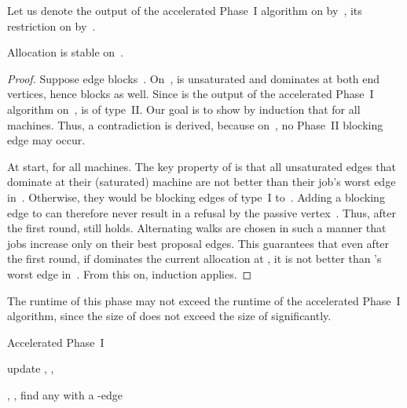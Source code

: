\documentclass{llncs}
\begin{document}
Let us denote the output of the accelerated Phase~I algorithm on  by~, its restriction on  by~.

\begin{claim}
	Allocation  is stable on~.
\end{claim}

\begin{proof}
	Suppose edge  blocks~. On~,  is unsaturated and dominates  at both end vertices, hence  blocks  as well. Since  is the output of the accelerated Phase~I algorithm on~,  is of type~II. Our goal is to show by induction that  for all machines. Thus, a contradiction is derived, because on~, no Phase~II blocking edge may occur.

	At start,  for all machines. The key property of  is that all unsaturated edges that dominate  at their (saturated) machine are not better than their job's worst edge in~. Otherwise, they would be blocking edges of type~I to~. Adding a blocking edge  to  can therefore never result in a refusal by the passive vertex~. Thus, after the first round,  still holds. Alternating walks are chosen in such a manner that jobs increase  only on their best proposal edges. This guarantees that even after the first round, if  dominates the current allocation  at , it is not better than 's worst edge in~. From this on, induction applies.
\end{proof}

The runtime of this phase may not exceed the runtime of the accelerated Phase~I algorithm, since the size of  does not exceed the size of  significantly.

\begin{algorithm}[H]
\renewcommand{\thealgorithm}{}
\label{alg:acc:phI}
\caption{Accelerated Phase~I}
\begin{algorithmic}
	\While{}
		\State {}
			\State {}
		\Else
			\State {}
		\EndIf		
	\State update , , 
	\EndWhile
\end{algorithmic}
\end{algorithm}

\begin{algorithmic}[]
	\label{FindWalk}
		\State , , find any  with a -edge
			\State 
			\State 
		\EndWhile
	\EndProcedure
\end{algorithmic}
\vline

\begin{algorithmic}[]
		\State 
		\For{}
			\State 
		\EndFor
		\For{}
			\State 
		\EndFor
	\EndProcedure
\end{algorithmic}
\vline
\end{document}
